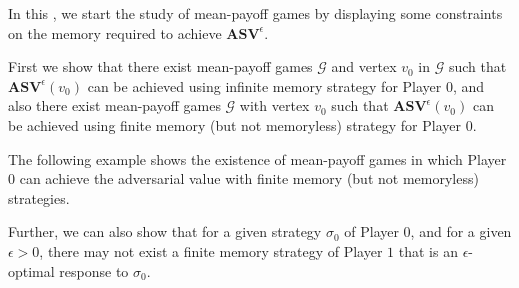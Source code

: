 In this \mychapter, we start the study of mean-payoff games by displaying some constraints on the memory required to achieve $\mathbf{ASV}^{\epsilon}$.

First we show that there exist mean-payoff games $\mathcal{G}$ and vertex $v_0$ in $\mathcal{G}$ such that $\mathbf{ASV}^{\epsilon}(v_0)$ can be achieved using infinite memory strategy for Player $0$, and also there exist mean-payoff games $\mathcal{G}$ with vertex $v_0$ such that $\mathbf{ASV}^{\epsilon}(v_0)$ can be achieved using finite memory (but not memoryless) strategy for Player $0$.



The following example shows the existence of mean-payoff games in which Player $0$ can achieve the adversarial value with finite memory (but not memoryless) strategies.



Further, we can also show that for a given strategy $\sigma_0$ of Player $0$, and for a given $\epsilon > 0$, there may not exist a finite memory strategy of Player $1$ that is an $\epsilon$-optimal response to $\sigma_0$.

